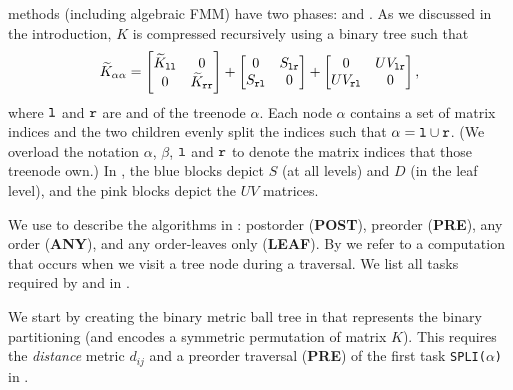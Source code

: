 \hmatrix{} methods (including algebraic FMM) have two phases:  and . 
As we discussed in the introduction, $K$ is compressed recursively using a binary tree
such that
\begin{equation}
  \label{e:partitioning}
  {\widetilde{K}}_{\alpha\alpha} =
\begin{bmatrix}
  {\widetilde{K}}_{{\tt l}{\tt l}} & 0 \\ 
  0 & {\widetilde{K}}_{{\tt r}{\tt r}} \\ 
\end{bmatrix} + 
\begin{bmatrix} 
0 & S_{{\tt l}{\tt r}} \\ 
S_{{\tt r}{\tt l}} & 0 \\ 
\end{bmatrix}+
\begin{bmatrix} 
  0 & UV_{{\tt l}{\tt r}} \\ 
  UV_{{\tt r}{\tt l}} & 0 \\ 
\end{bmatrix}, 
\end{equation} 
where ${\tt l}$ and ${\tt r}$ are  and  of the treenode $\alpha$.
Each node $\alpha$ contains a set of matrix indices and the two 
children evenly split the indices such that $\alpha = {\tt l} \cup {\tt r}$.
(We overload the notation $\alpha$, $\beta$, ${\tt l}$ and ${\tt r}$ to
denote the matrix indices that those treenode own.)
In , the blue blocks depict $S$ (at all levels) and $D$ 
(in the leaf level), and the pink blocks depict the $UV$  matrices.

We use  to describe the algorithms in \gofmm{}:
postorder (\textbf{POST}), preorder (\textbf{PRE}),
any order (\textbf{ANY}),
and any order-leaves only (\textbf{LEAF}).
By   we refer to a computation that occurs when we visit a tree node during a traversal. 
We list all tasks required by  and  in .

We start by creating the binary metric ball tree in 
that represents the binary partitioning (and encodes a symmetric permutation of matrix $K$).
This requires the \emph{distance} metric $d_{ij}$ and a preorder traversal
(\textbf{PRE}) of the first task \texttt{SPLI($\alpha$)} in . 


